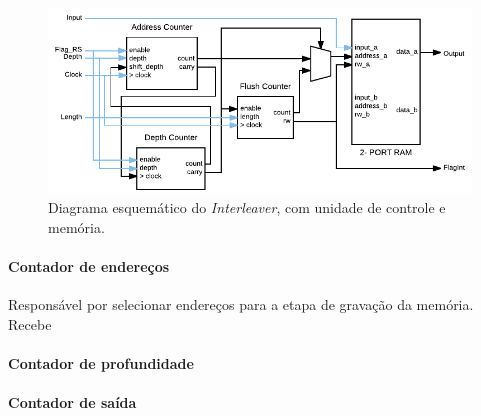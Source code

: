	\begin{figure}[h]
		\caption{\label{figure:interleaver-schematics}Diagrama esquemático do \textit{Interleaver}, com unidade de controle e memória.}
		\centering
		\includegraphics[width=1\textwidth]{interleaver/schematics.pdf}
	\end{figure}

	\paragraph{Contador de endereços}
	Responsável por selecionar endereços para a etapa de gravação da memória. Recebe 
	
	\paragraph{Contador de profundidade}
	
	\paragraph{Contador de saída}
	
